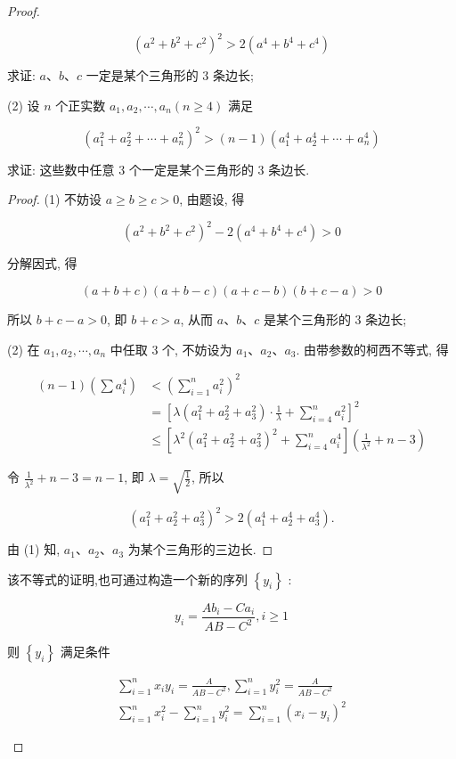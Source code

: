 \begin{proof}
\begin{example}
\begin{solution}
\begin{note}
\begin{solution}
\begin{example}
	$$
	\left(a^{2}+b^{2}+c^{2}\right)^{2}>2\left(a^{4}+b^{4}+c^{4}\right)
	$$
	
	求证: $a 、 b 、 c$ 一定是某个三角形的 3 条边长;
	
	(2) 设 $n$ 个正实数 $a_{1}, a_{2}, \cdots, a_{n}(n \geqslant 4)$ 满足
	
	$$
	\left(a_{1}^{2}+a_{2}^{2}+\cdots+a_{n}^{2}\right)^{2}>(n-1)\left(a_{1}^{4}+a_{2}^{4}+\cdots+a_{n}^{4}\right)
	$$
	
	求证: 这些数中任意 3 个一定是某个三角形的 3 条边长.
\end{example}
\begin{proof}
	(1) 不妨设 $a \geqslant b \geqslant c>0$, 由题设, 得
	
	$$
	\left(a^{2}+b^{2}+c^{2}\right)^{2}-2\left(a^{4}+b^{4}+c^{4}\right)>0
	$$
	
	分解因式, 得
	
	$$
	(a+b+c)(a+b-c)(a+c-b)(b+c-a)>0
	$$
	
	所以 $b+c-a>0$, 即 $b+c>a$, 从而 $a 、 b 、 c$ 是某个三角形的 3 条边长;
	
	(2) 在 $a_{1}, a_{2}, \cdots, a_{n}$ 中任取 3 个, 不妨设为 $a_{1} 、 a_{2} 、 a_{3}$. 由带参数的柯西不等式, 得
	
	$$
	\begin{aligned}
	(n-1)\left(\sum a_{i}^{4}\right) & <\left(\sum_{i=1}^{n} a_{i}^{2}\right)^{2} \\
	& =\left[\lambda\left(a_{1}^{2}+a_{2}^{2}+a_{3}^{2}\right) \cdot \frac{1}{\lambda}+\sum_{i=4}^{n} a_{i}^{2}\right]^{2} \\
	& \leqslant\left[\lambda^{2}\left(a_{1}^{2}+a_{2}^{2}+a_{3}^{2}\right)^{2}+\sum_{i=4}^{n} a_{i}^{4}\right]\left(\frac{1}{\lambda^{2}}+n-3\right)
	\end{aligned}
	$$
	
	令 $\frac{1}{\lambda^{2}}+n-3=n-1$, 即 $\lambda=\sqrt{\frac{1}{2}}$, 所以
	
	$$
	\left(a_{1}^{2}+a_{2}^{2}+a_{3}^{2}\right)^{2}>2\left(a_{1}^{4}+a_{2}^{4}+a_{3}^{4}\right) .
	$$
	
	由 (1) 知, $a_{1} 、 a_{2} 、 a_{3}$ 为某个三角形的三边长.
\end{proof}
\begin{note}
	该不等式的证明,也可通过构造一个新的序列 $\left\{y_{i}\right\}$ :
	
	$$
	y_{i}=\frac{A b_{i}-C a_{i}}{A B-C^{2}}, i \geqslant 1
	$$
	
	则 $\left\{y_{i}\right\}$ 满足条件
	
	$$
	\begin{gathered}
	\sum_{i=1}^{n} x_{i} y_{i}=\frac{A}{A B-C^{2}}, \sum_{i=1}^{n} y_{i}^{2}=\frac{A}{A B-C^{2}} \\
	\sum_{i=1}^{n} x_{i}^{2}-\sum_{i=1}^{n} y_{i}^{2}=\sum_{i=1}^{n}\left(x_{i}-y_{i}\right)^{2}
	\end{gathered}
	$$
	

\end{note}
\end{solution}
\end{note}
\end{solution}
\end{example}
\end{proof}
